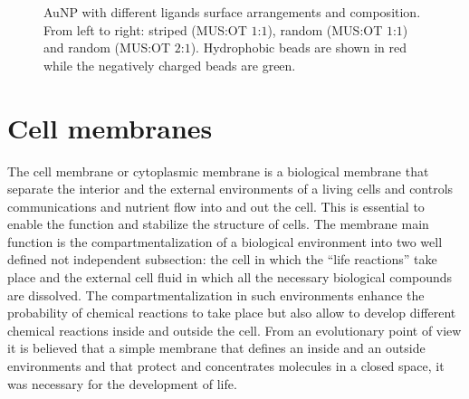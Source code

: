 \begin{figure}[!ht]
	\centering
	\qquad
	\qquad
	\caption{Au\acs{NP} with different ligands surface arrangements and composition. From left to right: striped (\ac{MUS}:\ac{OT} $1$:$1$), random (\ac{MUS}:\ac{OT} $1$:$1$) and random (\ac{MUS}:\ac{OT} $2$:$1$). Hydrophobic beads are shown in red while the negatively charged beads are green.}
	\label{fig:coating}
\end{figure}

\section{Cell membranes}
The cell membrane or cytoplasmic membrane is a biological membrane that separate the interior and the external environments of a living cells and controls communications and nutrient flow into and out the cell. This is essential to enable the function and stabilize the structure of cells. The membrane main function is the compartmentalization of a biological environment into two well defined not independent subsection: the cell in which the ``life reactions'' take place and the external cell fluid in which all the necessary biological compounds are dissolved. The compartmentalization in such environments enhance the probability of chemical reactions to take place but also allow to develop different chemical reactions inside and outside the cell. From an evolutionary point of view it is believed that a simple membrane that defines an inside and an outside environments and that protect and concentrates molecules in a closed space, it was necessary for the development of life. 

